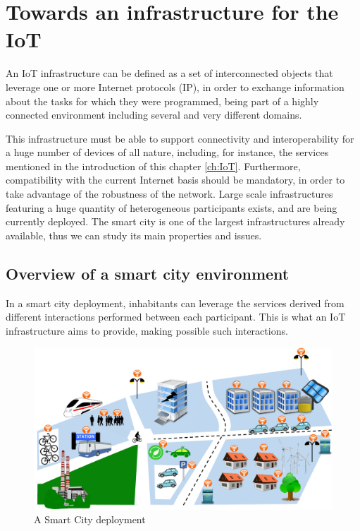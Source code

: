 \section{Towards an infrastructure for the IoT}
\label{sec:IoTInfra}
An IoT infrastructure can be defined as a set of interconnected objects that leverage one or more Internet protocols (IP), in order to exchange information about the tasks for which they were programmed, being part of a highly connected environment including several and very different domains.

This infrastructure must be able to support connectivity and interoperability for a huge number of devices of all nature, including, for instance, the services mentioned in the introduction of this chapter \ref{ch:IoT}.
Furthermore, compatibility with the current Internet basis should be mandatory, in order to take advantage of the robustness of the network.
Large scale infrastructures featuring a huge quantity of heterogeneous participants exists, and are being currently deployed.
The smart city is one of the largest infrastructures already available, thus we can study its main properties and issues.



\subsection{Overview of a smart city environment}
\label{sec:SmartCityEnv}
In a smart city deployment\cite{smartsantander}, inhabitants can leverage the services derived from different interactions performed between each participant.
This is what an IoT infrastructure aims to provide, making possible such interactions.

\begin{figure}[htb]
	\centering
	\includegraphics[width=1\columnwidth]{chapters/background.images/SmartCity_comm.pdf}
	\caption{A Smart City deployment}
	\label{fig:SmartCity}
\end{figure}

